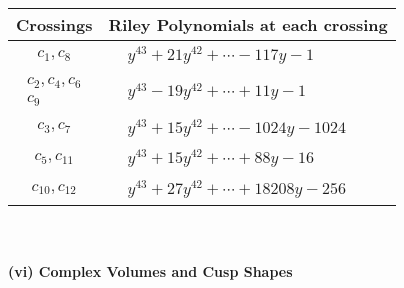 \documentclass[1p]{elsarticle_modified}
\theoremstyle{definition}
\begin{document}
\begin{tabular}{m{50pt}|m{274pt}}
Crossings & \hspace{64pt}Riley Polynomials at each crossing \\
\hline $$\begin{aligned}c_{1},c_{8}\end{aligned}$$&$\begin{aligned}
&y^{43}+21 y^{42}+\cdots-117 y-1
\end{aligned}$\\
\hline $$\begin{aligned}c_{2},c_{4},c_{6}\\c_{9}\end{aligned}$$&$\begin{aligned}
&y^{43}-19 y^{42}+\cdots+11 y-1
\end{aligned}$\\
\hline $$\begin{aligned}c_{3},c_{7}\end{aligned}$$&$\begin{aligned}
&y^{43}+15 y^{42}+\cdots-1024 y-1024
\end{aligned}$\\
\hline $$\begin{aligned}c_{5},c_{11}\end{aligned}$$&$\begin{aligned}
&y^{43}+15 y^{42}+\cdots+88 y-16
\end{aligned}$\\
\hline $$\begin{aligned}c_{10},c_{12}\end{aligned}$$&$\begin{aligned}
&y^{43}+27 y^{42}+\cdots+18208 y-256
\end{aligned}$\\
\hline
\end{tabular}\\~\\
\newpage\flushleft \textbf{(vi) Complex Volumes and Cusp Shapes}
\end{document}
